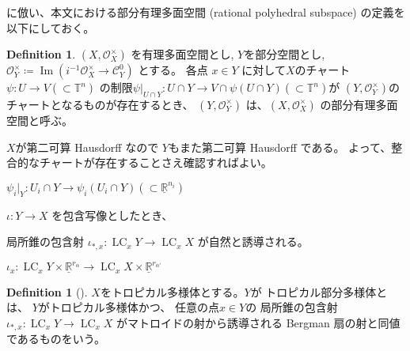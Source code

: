 \documentclass[a4paper,dvipdfmx,reqno,12pt]{amsart}
\theoremstyle{definition}
\newtheorem{definition}[theorem]{Definition}
\newcommand{\deq}{\coloneqq}
\newcommand{\opn}[1]{\operatorname{#1}}
\numberwithin{equation}{section}
\begin{document}
\cite[Definition 2.14]{demedrano2023chern}
に倣い、本文における部分有理多面空間
(rational polyhedral subspace)
の定義を以下にしておく。


\begin{definition}

$(X,\mathcal{O}_X^{\times})$ を有理多面空間とし,
$Y$を部分空間とし, 
$\mathcal{O}^{\times}_{Y}\deq 
\opn{Im}(i^{-1}\mathcal{O}_X^{\times}\to \mathcal{C}_{Y}^{0})$
とする。
各点 $x\in Y$ に対して$X$のチャート
$\psi\colon U\to V(\subset \mathbb{T}^{n})$
の制限$\psi|_{U\cap Y}\colon U\cap Y\to 
V\cap \psi(U\cap Y)(\subset \mathbb{T}^{n})$が
$(Y,\mathcal{O}_Y^{\times})$のチャートとなるものが存在するとき、
$(Y,\mathcal{O}_Y^{\times})$
は、$(X,\mathcal{O}^{\times}_X)$
の部分有理多面空間と呼ぶ。
\end{definition}

$X$が第二可算 Hausdorff なので
$Y$もまた第二可算 Hausdorff である。
よって、整合的なチャートが存在することさえ確認すればよい。

$\psi_i|_{Y}\colon U_i\cap Y \to \psi_i(U_i\cap Y)(\subset 
\underline{\mathbb{R}}^{n_i})$

$\iota\colon Y \to X$ を包含写像としたとき、

局所錐の包含射
$\iota_{*,x}\colon \opn{LC}_x Y\to \opn{LC}_x X$
が自然と誘導される。



$\iota_{x}\colon \opn{LC}_x Y\times 
\underline{\mathbb{R}}^{r_{\alpha}}
\to \opn{LC}_x X\times \underline{\mathbb{R}}^{r_{\alpha'}}$

\begin{definition}[{\cite[Definition 2.14]{demedrano2023chern}}]
$X$をトロピカル多様体とする。$Y$が
トロピカル部分多様体とは、
$Y$がトロピカル多様体かつ、
任意の点$x\in Y$の
局所錐の包含射
$\iota_{*,x}\colon \opn{LC}_x Y\to 
\opn{LC}_x X$
がマトロイドの射から誘導される
Bergman 扇の射と同値
であるものをいう。
\end{definition}
\end{document}

